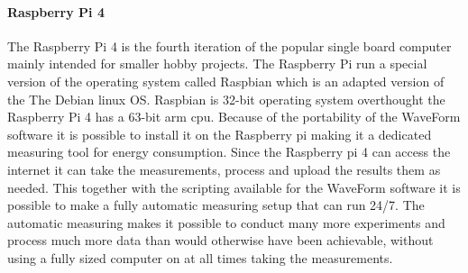 \paragraph*{Raspberry Pi 4}
The Raspberry Pi 4 is the fourth iteration of the popular single board computer mainly intended for smaller hobby projects. The Raspberry Pi run a special version of the operating system called Raspbian which is an adapted version of the The Debian linux OS. Raspbian is 32-bit operating system overthought the Raspberry Pi 4 has a 63-bit arm cpu. Because of the portability of the WaveForm software it is possible to install it on the Raspberry pi making it a dedicated measuring tool for energy consumption. Since the Raspberry pi 4 can access the internet it can take the measurements, process and  upload the results them as needed. This together with the scripting available for the WaveForm software it is possible to make a fully automatic measuring setup that can run 24/7. The automatic measuring makes it possible to conduct many more experiments and process much more data than would otherwise have been achievable, without using a fully sized computer on at all times taking the measurements.